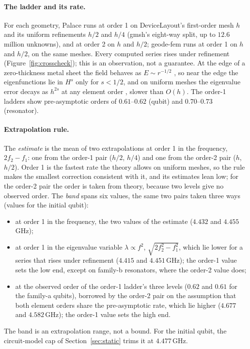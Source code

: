 \documentclass{anvil-paper}
\begin{document}
\paragraph{The ladder and its rate.}
For each geometry, Palace runs at order 1 on DeviceLayout's first-order
mesh $h$ and its uniform refinements $h/2$ and $h/4$ (gmsh's eight-way
split, up to $12.6$ million unknowns), and at order 2 on $h$ and $h/2$;
geode-fem runs at order 1 on $h$ and $h/2$, on the same meshes. Every
computed series rises under refinement (Figure~\ref{fig:crosscheck}); this
is an observation, not a guarantee. At the edge of a zero-thickness metal
sheet the field behaves as $E \sim r^{-1/2}$ \citep{meixner1972behavior},
so near the edge the eigenfunctions lie in $H^{s}$ only for $s < 1/2$, and
on uniform meshes the eigenvalue error decays as $h^{2s}$ at any element
order \citep{boffi2010finite}, slower than $O(h)$. The order-1
ladders show pre-asymptotic orders of $0.61$--$0.62$ (qubit) and $0.70$--$0.73$
(resonator).

\paragraph{Extrapolation rule.}
The \emph{estimate} is the mean of two extrapolations at order 1 in the
frequency, $2f_2 - f_1$: one from the order-1 pair ($h/2$, $h/4$) and one
from the order-2 pair ($h$, $h/2$). Order 1 is the fastest rate the theory
allows on uniform meshes, so the rule makes the smallest correction
consistent with it, and its estimates lean low; for the order-2 pair the
order is taken from theory, because two levels give no observed order. The
\emph{band} spans six values, the same two pairs taken three ways (values
for the initial qubit):
\begin{itemize}\setlength{\itemsep}{0pt}
  \item at order 1 in the frequency, the two values of the estimate
    ($4.432$ and $4.455$\,GHz);
  \item at order 1 in the eigenvalue variable $\lambda\propto f^2$,
    $\sqrt{2f_2^2 - f_1^2}$, which lie lower for a series that rises
    under refinement ($4.415$ and $4.451$\,GHz); the order-1 value sets
    the low end, except on family-b resonators, where the order-2 value
    does;
  \item at the observed order of the order-1 ladder's three levels
    ($0.62$ and $0.61$ for the family-a qubits), borrowed by the order-2
    pair on the assumption that both element orders share the
    pre-asymptotic rate, which lie higher ($4.677$ and $4.582$\,GHz); the
    order-1 value sets the high end.
\end{itemize}
The band is an extrapolation range, not a bound. For the initial qubit,
the circuit-model cap of Section~\ref{sec:static} trims it at
$4.477$\,GHz.
\end{document}
